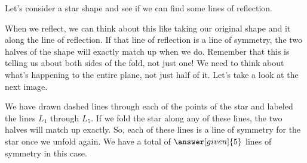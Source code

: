 \documentclass{ximera}
\begin{document}
\begin{example}
Let's consider a star shape and see if we can find some lines of reflection.
\begin{image}
\end{image}
When we reflect, we can think about this like taking our original shape and  it along the line of reflection. If that line of reflection is a line of symmetry, the two halves of the shape will exactly match up when we do. Remember that this is telling us about both sides of the fold, not just one! We need to think about what's happening to the entire plane, not just half of it. Let's take a look at the next image.

\begin{image}
\end{image}
We have drawn dashed lines through each of the points of the star and labeled the lines $L_1$ through $L_5$. If we fold the star along any of these lines, the two halves will match up exactly. So, each of these lines is a line of symmetry for the star once we unfold again. We have a total of $\answer[given]{5}$ lines of symmetry in this case.

\end{example}
\end{document}
